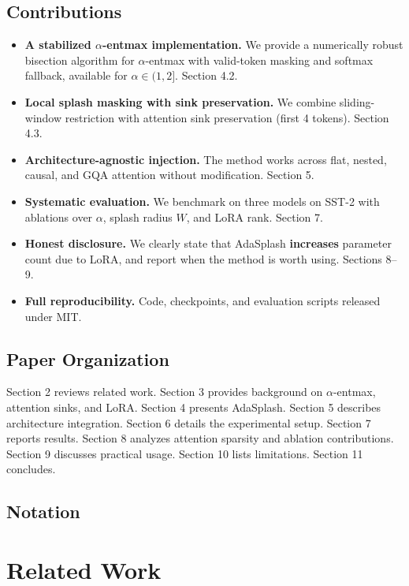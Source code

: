 \subsection{Contributions}

\begin{itemize}
\item \textbf{A stabilized $\alpha$-entmax implementation.} We provide a numerically robust
  bisection algorithm for $\alpha$-entmax with valid-token masking and softmax
  fallback, available for $\alpha \in (1, 2]$. Section 4.2.
\item \textbf{Local splash masking with sink preservation.} We combine sliding-window
  restriction with attention sink preservation (first 4 tokens). Section 4.3.
\item \textbf{Architecture-agnostic injection.} The method works across flat, nested,
  causal, and GQA attention without modification. Section 5.
\item \textbf{Systematic evaluation.} We benchmark on three models on SST-2 with
  ablations over $\alpha$, splash radius $W$, and LoRA rank. Section 7.
\item \textbf{Honest disclosure.} We clearly state that AdaSplash \textbf{increases}
  parameter count due to LoRA, and report when the method is worth using.
  Sections 8--9.
\item \textbf{Full reproducibility.} Code, checkpoints, and evaluation scripts released
  under MIT.

\end{itemize}
\subsection{Paper Organization}

Section 2 reviews related work. Section 3 provides background on $\alpha$-entmax, 
attention sinks, and LoRA. Section 4 presents AdaSplash. Section 5 describes 
architecture integration. Section 6 details the experimental setup. Section 7 
reports results. Section 8 analyzes attention sparsity and ablation 
contributions. Section 9 discusses practical usage. Section 10 lists 
limitations. Section 11 concludes.



\subsection{Notation}



\section{Related Work}

